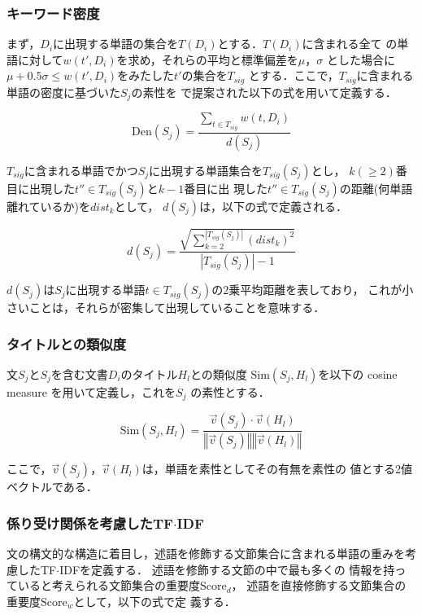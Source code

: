 \subsubsection*{キーワード密度\cite{article25}}

まず，$D_i$に出現する単語の集合を$T(D_i)$とする．$T(D_i)$に含まれる全て
の単語に対して$w(t',D_i)$を求め，それらの平均と標準偏差を$\mu$，$\sigma$
とした場合に$\mu+0.5\sigma \le w(t',D_i)$をみたした$t'$の集合を$T_{sig}$
とする．ここで，$T_{sig}$に含まれる単語の密度に基づいた$S_j$の素性を
\cite{article29}で提案された以下の式を用いて定義する．

\[
 \mbox{Den}(S_j) = \frac{\sum_{t \in T_{sig}} w(t,D_i)}{d(S_j)}
\]

$T_{sig}$に含まれる単語でかつ$S_j$に出現する単語集合を$T_{sig}(S_j)$とし，
$k(\ge 2)$番目に出現した$t'' \in T_{sig}(S_j)$と$k-1$番目に出
現した$t''\in T_{sig}(S_j)$の距離(何単語離れているか)を$dist_k$として，
$d(S_j)$は，以下の式で定義される．

\[
 d(S_j) = \frac{\sqrt{\sum_{k=2}^{|T_{sig}(S_j)|} (dist_k)^2}}{|T_{sig}(S_j)|-1} 
\]

$d(S_j)$は$S_j$に出現する単語$t \in T_{sig}(S_j)$の2乗平均距離を表しており，
これが小さいことは，それらが密集して出現していることを意味する．


\subsubsection*{タイトルとの類似度\cite{article2}}

文$S_j$と$S_j$を含む文書$D_i$のタイトル$H_l$との類似度
$\mbox{Sim}(S_j,H_l)$を以下の cosine measure を用いて定義し，これを$S_j$
の素性とする．


\[
 \mbox{Sim}(S_j,H_l) = \frac{\vec v(S_j) \cdot \vec v(H_l)}{ \left \Vert \vec v(S_j)
 \right \Vert \left \Vert \vec v(H_l) \right \Vert}
\]

ここで，$\vec v(S_j)$，$\vec v(H_l)$は，単語を素性としてその有無を素性の
値とする2値ベクトルである．

\subsubsection*{係り受け関係を考慮したTF$\cdot$IDF}

文の構文的な構造に着目し，述語を修飾する文節集合に含まれる単語の重みを考
慮したTF$\cdot$IDFを定義する．
述語を修飾する文節の中で最も多くの
情報を持っていると考えられる文節集合の重要度$\mbox{Score}_{d}$，
述語を直接修飾する文節集合の重要度$\mbox{Score}_{w}$として，以下の式で定
義する．

